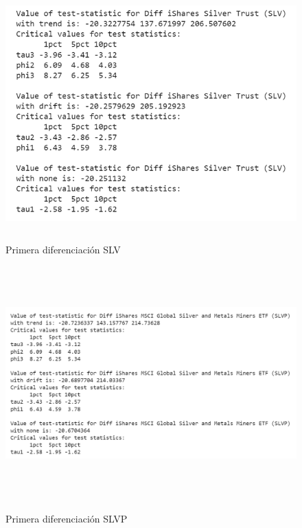 \documentclass[11pt]{article}
\begin{document}
    \begin{figure}[!ht]
      \centering
      \includegraphics[width=12cm, height=9cm]{Imagenes/1er diff SLV.png}
      \label{fig:Anexo}
      \caption{Primera diferenciación SLV}
      \vspace{0cm}
    \end{figure}

    \begin{figure}[!ht]
      \centering
      \includegraphics[width=16cm, height=9cm]{Imagenes/1er diff SLVP.png}
      \label{fig:Anexo}
      \caption{Primera diferenciación SLVP}
      \vspace{0cm}
    \end{figure}
\end{document}
